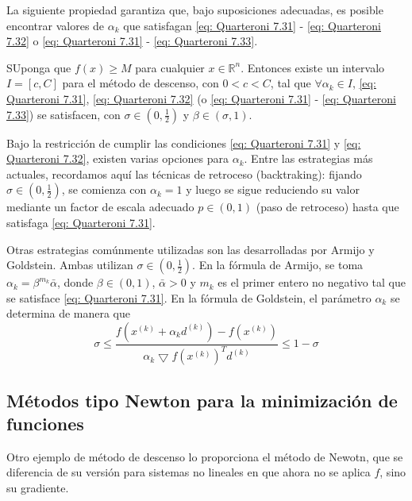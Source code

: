 La siguiente propiedad garantiza que, bajo suposiciones adecuadas, es posible encontrar valores de $\alpha_k$ que satisfagan \ref{eq: Quarteroni 7.31} - \ref{eq: Quarteroni 7.32} o \ref{eq: Quarteroni 7.31} - \ref{eq: Quarteroni 7.33}.

\begin{property}
    SUponga que $f(x) \geq M$ para cualquier $x \in \mathbb{R}^n$. Entonces existe un intervalo $I = [c, C]$ para el método de descenso, con $0 < c < C$, tal que $\forall \alpha_k \in I$, \ref{eq: Quarteroni 7.31}, \ref{eq: Quarteroni 7.32} (o \ref{eq: Quarteroni 7.31} - \ref{eq: Quarteroni 7.33}) se satisfacen, con $\sigma \in \left( 0, \frac{1}{2} \right)$ y $\beta \in \left( \sigma, 1 \right)$.
\end{property}

Bajo la restricción de cumplir las condiciones \ref{eq: Quarteroni 7.31} y \ref{eq: Quarteroni 7.32}, existen varias opciones para $\alpha_k$. Entre las estrategias más actuales, recordamos aquí las técnicas de retroceso (backtraking): fijando $\sigma \in \left( 0, \frac{1}{2} \right)$, se comienza con $\alpha_k = 1$ y luego se sigue reduciendo su valor mediante un factor de escala adecuado $p \in (0, 1)$ (paso de retroceso) hasta que satisfaga \ref{eq: Quarteroni 7.31}.

Otras estrategias comúnmente utilizadas son las desarrolladas por Armijo y Goldstein. Ambas utilizan \( \sigma \in (0, \frac{1}{2}) \). En la fórmula de Armijo, se toma \( \alpha_k = \beta^{m_k} \bar{\alpha} \), donde \( \beta \in (0, 1) \), \( \bar{\alpha} > 0 \) y \( m_k \) es el primer entero no negativo tal que se satisface \ref{eq: Quarteroni 7.31}. En la fórmula de Goldstein, el parámetro \( \alpha_k \) se determina de manera que
\begin{equation}
    \sigma \leq \frac{f(x^{(k)} + \alpha_k d^{(k)}) - f(x^{(k)})}{\alpha_k \bigtriangledown f(x^{(k)})^T d^{(k)}} \leq 1 - \sigma
\end{equation}

\subsection{Métodos tipo Newton para la minimización de funciones}
Otro ejemplo de método de descenso lo proporciona el método de Newotn, que se diferencia de su versión para sistemas no lineales en que ahora no se aplica $f$, sino su gradiente.

